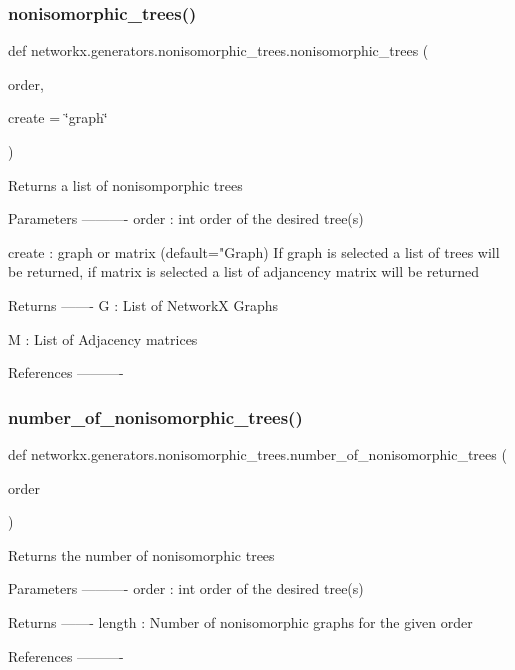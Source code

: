 \subsubsection{\texorpdfstring{nonisomorphic\+\_\+trees()}{nonisomorphic\_trees()}}
{\footnotesize\ttfamily def networkx.\+generators.\+nonisomorphic\+\_\+trees.\+nonisomorphic\+\_\+trees (\begin{DoxyParamCaption}\item[{}]{order,  }\item[{}]{create = {\ttfamily \char`\"{}graph\char`\"{}} }\end{DoxyParamCaption})}

\begin{DoxyVerb}Returns a list of nonisomporphic trees

Parameters
----------
order : int
  order of the desired tree(s)

create : graph or matrix (default="Graph)
  If graph is selected a list of trees will be returned,
  if matrix is selected a list of adjancency matrix will
  be returned

Returns
-------
G : List of NetworkX Graphs

M : List of Adjacency matrices

References
----------\end{DoxyVerb}
 \mbox{\label{namespacenetworkx_1_1generators_1_1nonisomorphic__trees_a66d9b154b22e025c5c680efc6273fee7}} 
\subsubsection{\texorpdfstring{number\+\_\+of\+\_\+nonisomorphic\+\_\+trees()}{number\_of\_nonisomorphic\_trees()}}
{\footnotesize\ttfamily def networkx.\+generators.\+nonisomorphic\+\_\+trees.\+number\+\_\+of\+\_\+nonisomorphic\+\_\+trees (\begin{DoxyParamCaption}\item[{}]{order }\end{DoxyParamCaption})}

\begin{DoxyVerb}Returns the number of nonisomorphic trees

Parameters
----------
order : int
  order of the desired tree(s)

Returns
-------
length : Number of nonisomorphic graphs for the given order

References
----------\end{DoxyVerb}
 